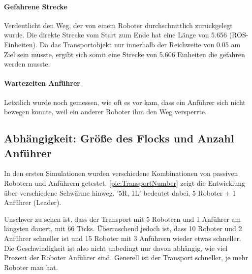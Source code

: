 \paragraph*{Gefahrene Strecke}
Verdeutlicht den Weg, der von einem Roboter durchschnittlich zurückgelegt wurde. Die direkte Strecke vom Start zum Ende hat eine Länge von 5.656 (\ac{ROS}-Einheiten). Da das Transportobjekt nur innerhalb der Reichweite von 0.05 am Ziel sein musste, ergibt sich somit eine Strecke von 5.606 Einheiten die gefahren werden musste.

\paragraph*{Wartezeiten Anführer}
Letztlich wurde noch gemessen, wie oft es vor kam, dass ein Anführer sich nicht bewegen konnte, weil ein anderer Roboter ihm den Weg versperrte.

\subsection*{Abhängigkeit: Größe des Flocks und Anzahl Anführer}

In den ersten Simulationen wurden verschiedene Kombinationen von passiven Robotern und Anführern getestet. \autoref{pic:TransportNumber} zeigt die Entwicklung über verschiedene Schwärme hinweg. '5R, 1L' bedeutet dabei, 5 Roboter + 1 Anführer (Leader).

Unschwer zu sehen ist, dass der Transport mit 5 Robotern und 1 Anführer am längsten dauert, mit 66 Ticks. Überraschend jedoch ist, dass 10 Roboter und 2 Anführer schneller ist und 15 Roboter mit 3 Anführern wieder etwas schneller. Die Geschwindigkeit ist also nicht unbedingt nur davon abhängig, wie viel Prozent der Roboter Anführer sind. Generell ist der Transport schneller, je mehr Roboter man hat.

\newcommand{\sectionTransportPictureWidth}{7.5cm}
\newcommand{\sectionTransportPictureHeight}{3.5cm}

